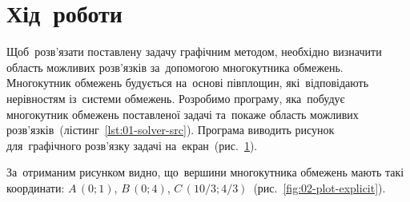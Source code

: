 \documentclass[
  a4paper,
  oneside,
  BCOR = 10mm,
  DIV = 12,
  12pt,
  headings = normal,
]{scrartcl}
\newlength{\gridunitwidth}
\begin{document}
  \section{Хід~роботи}
    Щоб~розв'язати поставлену задачу графічним методом, необхідно визначити область можливих розв'язків за~допомогою многокутника обмежень. Многокутник обмежень будується на~основі півплощин, які~відповідають нерівностям із~системи обмежень. Розробимо програму, яка~побудує многокутник обмежень поставленої задачі та~покаже область можливих розв'язків~(лістинг~\ref{lst:01-solver-src}). Програма виводить рисунок для~графічного розв'язку задачі на~екран~(рис.~\ref{fig:01-plot-export}).

    \begin{figure}[!htbp]
      \centering
      \resizebox{9\gridunitwidth}{!}{}
      \caption{}
      \label{fig:01-plot-export}
    \end{figure}

    За~отриманим рисунком видно, що~вершини многокутника обмежень мають такі координати: $A\,(0; 1)$, $B\,(0; 4)$, $C\,(10/3; 4/3)$~(рис.~\ref{fig:02-plot-explicit}).
\end{document}
